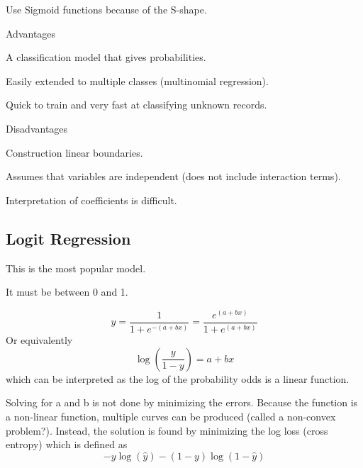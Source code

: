 Use Sigmoid functions because of the S-shape.

Advantages
	\begin{bulletedlist}
		\item A classification model that gives probabilities.
		\item Easily extended to multiple classes (multinomial regression).
		\item Quick to train and very fast at classifying unknown records.
	\end{bulletedlist}


Disadvantages
	\begin{bulletedlist}
		\item Construction linear boundaries.
		\item Assumes that variables are independent (does not include interaction terms).
		\item Interpretation of coefficients is difficult.
	\end{bulletedlist}


    \subsection{Logit Regression}
    \begin{bulletedlist}
		\item This is the most popular model.
		\item It must be between 0 and 1.
    \end{bulletedlist}

	\begin{equation}
		y = \frac{1}{1+e^{-\left(a+bx\right)}} = \frac{e^{\left(a+bx\right)}}{1+e^{\left(a+bx\right)}}
	\end{equation}
Or equivalently
	\begin{equation}
		\log\left(\frac{y}{1-y}\right) = a+bx
	\end{equation}
which can be interpreted as the log of the probability odds is a linear function.

Solving for a and b is not done by minimizing the errors.  Because the function is a non-linear function, multiple curves can be produced (called a non-convex problem?).  Instead, the solution is found by minimizing the log loss (cross entropy) which is defined as
	\begin{equation}
		-y\log\left(\hat{y}\right) - \left(1-y\right)\log\left(1-\hat{y}\right)
	\end{equation}
	\begin{mathwhere}[0.49in]
	\end{mathwhere}


